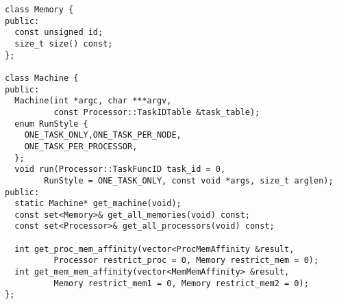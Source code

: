 

\begin{lstlisting}[float={t},label={lst:machineapi},caption={Machine Interface.}]
class Memory {
public:
  const unsigned id;
  size_t size() const;
};

class Machine {
public:
  Machine(int *argc, char ***argv,
          const Processor::TaskIDTable &task_table);
  enum RunStyle {
    ONE_TASK_ONLY,ONE_TASK_PER_NODE,
    ONE_TASK_PER_PROCESSOR,
  };
  void run(Processor::TaskFuncID task_id = 0, 
        RunStyle = ONE_TASK_ONLY, const void *args, size_t arglen);
public:
  static Machine* get_machine(void);
  const set<Memory>& get_all_memories(void) const;
  const set<Processor>& get_all_processors(void) const;

  int get_proc_mem_affinity(vector<ProcMemAffinity &result,
          Processor restrict_proc = 0, Memory restrict_mem = 0);
  int get_mem_mem_affinity(vector<MemMemAffinity> &result,
          Memory restrict_mem1 = 0, Memory restrict_mem2 = 0);
};
\end{lstlisting}


